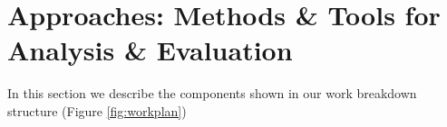 \section{Approaches: Methods \& Tools for Analysis \& Evaluation}

In this section we describe the components shown in our work breakdown structure (Figure \ref{fig:workplan})












